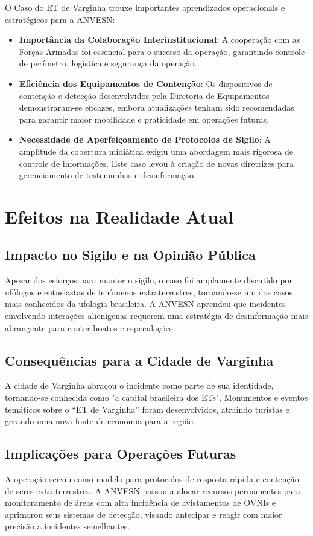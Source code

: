 O Caso do ET de Varginha trouxe importantes aprendizados operacionais e estratégicos para a ANVESN:

\begin{itemize}
    \item \textbf{Importância da Colaboração Interinstitucional}: A cooperação com as Forças Armadas foi essencial para o sucesso da operação, garantindo controle de perímetro, logística e segurança da operação.
    \item \textbf{Eficiência dos Equipamentos de Contenção}: Os dispositivos de contenção e detecção desenvolvidos pela Diretoria de Equipamentos demonstraram-se eficazes, embora atualizações tenham sido recomendadas para garantir maior mobilidade e praticidade em operações futuras.
    \item \textbf{Necessidade de Aperfeiçoamento de Protocolos de Sigilo}: A amplitude da cobertura midiática exigiu uma abordagem mais rigorosa de controle de informações. Este caso levou à criação de novas diretrizes para gerenciamento de testemunhas e desinformação.
\end{itemize}

\section{ Efeitos na Realidade Atual}

\subsection{Impacto no Sigilo e na Opinião Pública}
Apesar dos esforços para manter o sigilo, o caso foi amplamente discutido por ufólogos e entusiastas de fenômenos extraterrestres, tornando-se um dos casos mais conhecidos da ufologia brasileira. A ANVESN aprendeu que incidentes envolvendo interações alienígenas requerem uma estratégia de desinformação mais abrangente para conter boatos e especulações.

\subsection{Consequências para a Cidade de Varginha}
A cidade de Varginha abraçou o incidente como parte de sua identidade, tornando-se conhecida como "a capital brasileira dos ETs". Monumentos e eventos temáticos sobre o “ET de Varginha” foram desenvolvidos, atraindo turistas e gerando uma nova fonte de economia para a região.

\subsection{Implicações para Operações Futuras}
A operação serviu como modelo para protocolos de resposta rápida e contenção de seres extraterrestres. A ANVESN passou a alocar recursos permanentes para monitoramento de áreas com alta incidência de avistamentos de OVNIs e aprimorou seus sistemas de detecção, visando antecipar e reagir com maior precisão a incidentes semelhantes.

